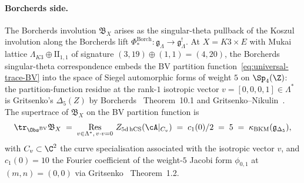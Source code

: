 \paragraph{Borcherds side.}
The Borcherds involution $\mathfrak{B}_X$ arises as the singular-theta
pullback of the Koszul involution along the Borcherds lift
$\Phi^{\mathrm{Borch}}_*: \mathfrak{g}_\Lambda\to \mathfrak{g}_\Lambda^!$.
At $X = K3\times E$ with Mukai lattice $\Lambda_{K3}\oplus\mathrm{II}_{1,1}$
of signature $(3,19)\oplus (1,1) = (4,20)$, the Borcherds singular-theta
correspondence embeds the BV partition function~\eqref{eq:universal-trace-BV}
into the space of Siegel automorphic forms of weight $5$ on $\Sp_4(\Z)$:
the partition-function residue at the rank-$1$ isotropic vector
$v = [0,0,0,1]\in\Lambda^*$ is Gritsenko's $\Delta_5(Z)$ by
Borcherds~\cite{Borcherds1998} Theorem~10.1 and
Gritsenko--Nikulin~\cite{GritsenkoNikulin1997}. The supertrace of
$\mathfrak{B}_X$ on the BV partition function is
\begin{equation}
\label{eq:borcherds-trace-BV}
  \tr_{\Obs^{\mathrm{BV}}}\mathfrak{B}_X
  \;=\;
  \operatorname*{Res}_{v\in\Lambda^*,\,v\cdot v = 0}\,
  Z_{5\mathrm{d\,hCS}}(\cA|_{C_v})
  \;=\; c_1(0)/2 \;=\; 5 \;=\; \kappa_{\mathrm{BKM}}(\mathfrak{g}_{\Delta_5}),
\end{equation}
with $C_v\subset\C^2$ the curve specialisation associated with the
isotropic vector $v$, and $c_1(0) = 10$ the Fourier coefficient of
the weight-$5$ Jacobi form $\phi_{0,1}$ at $(m,n) = (0,0)$ via
Gritsenko~\cite{Gritsenko1999} Theorem~1.2.

